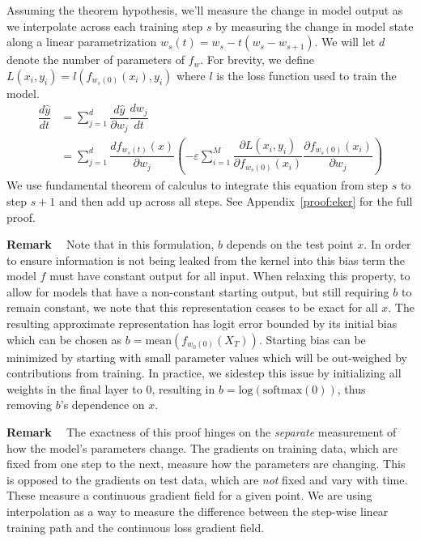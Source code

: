 \begin{sproof}
Assuming the theorem hypothesis, we'll measure the change in model output as we interpolate across each training step $s$ by measuring the change in model state along a linear parametrization $w_s(t) = w_s - t(w_s - w_{s+1})$. We will let $d$ denote the number of parameters of $f_w$. For brevity, we define $L(x_i, y_i)= l(f_{w_s(0)}(x_i),  y_i)$ where $l$ is the loss function used to train the model.
\begin{align}
    \dfrac{d \hat y}{dt} &= \sum_{j = 1}^{d} \dfrac{d \hat y}{\partial w_j} \dfrac{d w_j}{dt}\\
&= \sum_{j = 1}^{d} \dfrac{d f_{w_s(t)}(x)}{\partial w_j} \left(-\varepsilon \sum_{i = 1}^{M}\dfrac{\partial L(x_i, y_i)}{\partial f_{w_s(0)}(x_i)}\dfrac{\partial f_{w_s(0)}(x_i)}{\partial w_j}\right) \label{eq11}
\end{align}
We use fundamental theorem of calculus to integrate this equation from step $s$ to  step $s+1$ and then add up across all steps. See Appendix~\ref{proof:eker} for the full proof.
\end{sproof}

\textbf{Remark ~} Note that in this formulation, $b$ depends on the test point $x$.
In order to ensure information is not being leaked from the kernel into this bias term the model $f$ must have constant output for all input. 
When relaxing this property, to allow for models that have a non-constant starting output, but still requiring $b$ to remain constant, we note that this representation ceases to be exact for all $x$.
The resulting approximate representation has logit error bounded by its initial bias which can be chosen as $b = \text{mean}(f_{w_0(0)}(X_T))$.
Starting bias can be minimized by starting with small parameter values which will be out-weighed by contributions from training.
In practice, we sidestep this issue by initializing all weights in the final layer to $0$, resulting in $b=\text{log}(\text{softmax}(0))$, thus removing $b$'s dependence on $x$.

\textbf{Remark ~} 
The exactness of this proof hinges on the \emph{separate} measurement of how the model's parameters change.
The gradients on training data, which are fixed from one step to the next, measure how the parameters are changing.
This is opposed to the gradients on test data, which are \textit{not} fixed and vary with time.
These measure a continuous gradient field for a given point.
We are using interpolation as a way to measure the difference between the step-wise linear training path and the continuous loss gradient field. 

